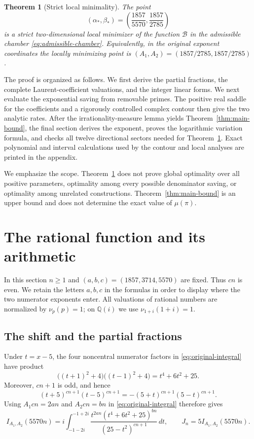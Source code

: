 \documentclass[11pt,reqno,letterpaper]{amsart}
\numberwithin{equation}{section}
\newtheorem{theorem}{Theorem}[section]
\theoremstyle{definition}
\theoremstyle{remark}
\begin{document}
\begin{theorem}[Strict local minimality]\label{thm:local-minimum}
The point
\[
  (\alpha_*,\beta_*)
  =\left(\frac{1857}{5570},\frac{1857}{2785}\right)
\]
is a strict two-dimensional local minimizer of the function $\mathcal B$
in the admissible chamber \eqref{eq:admissible-chamber}.  Equivalently, in
the original exponent coordinates the locally minimizing point is
$(A_1,A_2)=(1857/2785,1857/2785)$.
\end{theorem}

The proof is organized as follows.  We first derive the partial fractions,
the complete Laurent-coefficient valuations, and the integer linear forms.
We next evaluate the exponential saving from removable primes.  The
positive real saddle for the coefficients and a rigorously controlled
complex contour then give the two analytic rates.  After the
irrationality-measure lemma yields Theorem~\ref{thm:main-bound}, the final
section derives the exponent, proves the logarithmic variation formula,
and checks all twelve directional sectors needed for
Theorem~\ref{thm:local-minimum}.  Exact polynomial and interval calculations
used by the contour and local analyses are printed in the appendix.

We emphasize the scope.  Theorem~\ref{thm:local-minimum} does not prove
global optimality over all positive parameters, optimality among every
possible denominator saving, or optimality among unrelated constructions.
Theorem~\ref{thm:main-bound} is an upper bound and does not determine the
exact value of $\mu(\pi)$.

\section{The rational function and its arithmetic}\label{sec:arithmetic}

In this section $n\geq1$ and $(a,b,c)=(1857,3714,5570)$ are fixed.
Thus $cn$ is even.  We retain the letters $a,b,c$ in the formulas in
order to display where the two numerator exponents enter.  All valuations
of rational numbers are normalized by $\nu_p(p)=1$; on $\mathbb Q(i)$ we
use $\nu_{1+i}(1+i)=1$.

\subsection{The shift and the partial fractions}

Under $t=x-5$, the four noncentral numerator factors in
\eqref{eq:original-integral} have product
\[
 \bigl((t+1)^2+4\bigr)\bigl((t-1)^2+4\bigr)
 =t^4+6t^2+25.
\]
Moreover, $cn+1$ is odd, and hence
\[
 (t+5)^{cn+1}(t-5)^{cn+1}
 =-(5+t)^{cn+1}(5-t)^{cn+1}.
\]
Using $A_1cn=2an$ and $A_2cn=bn$ in
\eqref{eq:original-integral} therefore gives
\begin{equation}\label{eq:shifted-integral-identity}
 I_{A_1,A_2}(5570n)
 =i\int_{-1-2i}^{-1+2i}
 \frac{t^{2an}(t^4+6t^2+25)^{bn}}
 {(25-t^2)^{cn+1}}\,dt,
 \qquad J_n=5I_{A_1,A_2}(5570n).
\end{equation}
\end{document}
